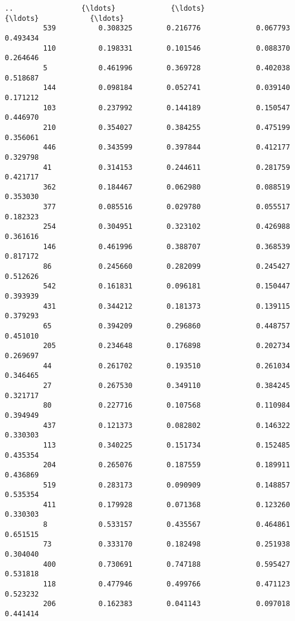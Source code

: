 \documentclass[11pt]{article}
\begin{document}
\begin{Verbatim}[commandchars=\\\{\}]
         ..                {\ldots}             {\ldots}                  {\ldots}            {\ldots}   
         539          0.308325        0.216776             0.067793       0.493434   
         110          0.198331        0.101546             0.088370       0.264646   
         5            0.461996        0.369728             0.402038       0.518687   
         144          0.098184        0.052741             0.039140       0.171212   
         103          0.237992        0.144189             0.150547       0.446970   
         210          0.354027        0.384255             0.475199       0.356061   
         446          0.343599        0.397844             0.412177       0.329798   
         41           0.314153        0.244611             0.281759       0.421717   
         362          0.184467        0.062980             0.088519       0.353030   
         377          0.085516        0.029780             0.055517       0.182323   
         254          0.304951        0.323102             0.426988       0.361616   
         146          0.461996        0.388707             0.368539       0.817172   
         86           0.245660        0.282099             0.245427       0.512626   
         542          0.161831        0.096181             0.150447       0.393939   
         431          0.344212        0.181373             0.139115       0.379293   
         65           0.394209        0.296860             0.448757       0.451010   
         205          0.234648        0.176898             0.202734       0.269697   
         44           0.261702        0.193510             0.261034       0.346465   
         27           0.267530        0.349110             0.384245       0.321717   
         80           0.227716        0.107568             0.110984       0.394949   
         437          0.121373        0.082802             0.146322       0.330303   
         113          0.340225        0.151734             0.152485       0.435354   
         204          0.265076        0.187559             0.189911       0.436869   
         519          0.283173        0.090909             0.148857       0.535354   
         411          0.179928        0.071368             0.123260       0.330303   
         8            0.533157        0.435567             0.464861       0.651515   
         73           0.333170        0.182498             0.251938       0.304040   
         400          0.730691        0.747188             0.595427       0.531818   
         118          0.477946        0.499766             0.471123       0.523232   
         206          0.162383        0.041143             0.097018       0.441414   
         

\end{Verbatim}
\end{document}

